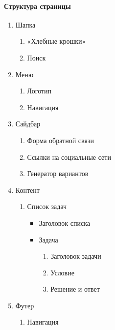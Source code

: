 \paragraph{Структура страницы}
\begin{enumerate}
	\item Шапка
	\begin{enumerate}
		\item «Хлебные крошки»
		\item Поиск
	\end{enumerate}

	\item Меню
	\begin{enumerate}
		\item Логотип
		\item Навигация
	\end{enumerate}

	\item Сайдбар
	\begin{enumerate}
		\item Форма обратной связи
		\item Ссылки на социальные сети
		\item Генератор вариантов
	\end{enumerate}

	\item Контент
	\begin{enumerate}
		\item Список задач
		\begin{itemize}
		\item Заголовок списка
		\item Задача
		\begin{enumerate}
			\item Заголовок задачи
			\item Условие
			\item Решение и ответ
		\end{enumerate}
		\end{itemize}
	\end{enumerate}

	\item Футер
	\begin{enumerate}
		\item Навигация
	\end{enumerate}
\end{enumerate}

